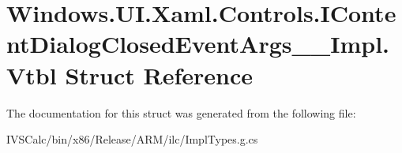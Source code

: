 \hypertarget{struct_windows_1_1_u_i_1_1_xaml_1_1_controls_1_1_i_content_dialog_closed_event_args_____impl_1_1_vtbl}{}\section{Windows.\+U\+I.\+Xaml.\+Controls.\+I\+Content\+Dialog\+Closed\+Event\+Args\+\_\+\+\_\+\+Impl.\+Vtbl Struct Reference}
\label{struct_windows_1_1_u_i_1_1_xaml_1_1_controls_1_1_i_content_dialog_closed_event_args_____impl_1_1_vtbl}


The documentation for this struct was generated from the following file\+:\begin{DoxyCompactItemize}
\item 
I\+V\+S\+Calc/bin/x86/\+Release/\+A\+R\+M/ilc/Impl\+Types.\+g.\+cs\end{DoxyCompactItemize}
